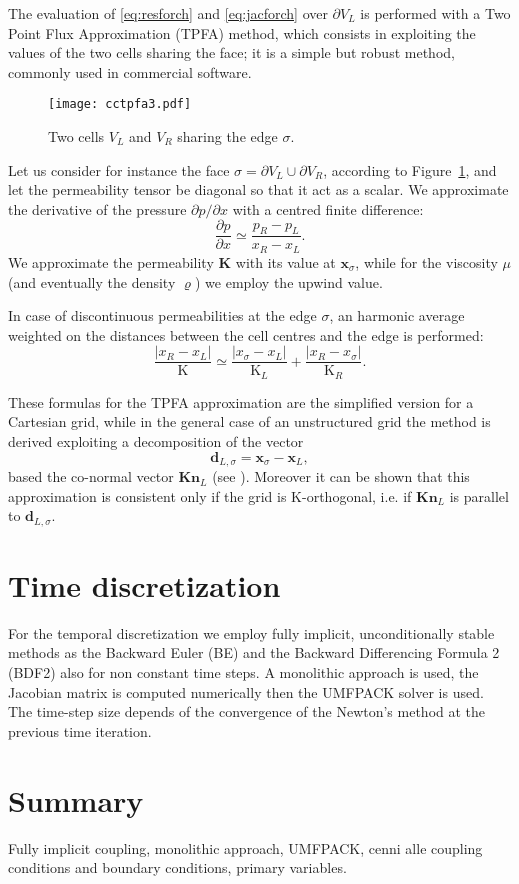 The evaluation of \eqref{eq:resforch} and \eqref{eq:jacforch} over $\partial 
V_L$ is performed with a Two Point Flux Approximation (TPFA) method, which 
consists in exploiting the values of the two cells sharing the face; it is a 
simple but robust method, commonly used in commercial software.
\begin{figure}
	\centering
	\texttt{[image: cctpfa3.pdf]}
	\caption{Two cells $V_L$ and $V_R$ sharing the edge $\sigma$.}
	\label{fig:cctpfa}
\end{figure}
Let us consider for instance the face $\sigma = \partial V_L \cup \partial 
V_R$, according to Figure~\ref{fig:cctpfa}, and let the permeability tensor be 
diagonal so that it act as a scalar. We approximate the derivative of the 
pressure $\partial p /\partial 
x$ with a centred finite difference:
\begin{equation}
\frac{\partial p}{\partial x} \simeq \frac{p_R-p_L}{x_R -x_L}.
\end{equation}
We approximate the permeability $\mathbf{K}$ with its value at 
$\mathbf{x}_\sigma$, while 
for the viscosity $\mu$ (and eventually the density $\varrho$) we employ the 
upwind value.

In case of discontinuous permeabilities at the edge $\sigma$, an harmonic 
average weighted on the distances between the cell centres and the edge is 
performed:
\begin{equation}
\frac{|x_R - x_L|}{\mathrm{K}} \simeq 
\frac{|x_\sigma - x_L|}{\mathrm{K}_L}+\frac{|x_R - x_\sigma|}{\mathrm{K}_R}.
\end{equation}

These formulas for the TPFA approximation are the simplified version for a 
Cartesian grid, while in the general case of an unstructured grid the method is 
derived exploiting a decomposition of the vector
\begin{equation}
\mathbf{d}_{L,\sigma}=\mathbf{x}_\sigma - \mathbf{x}_L,
\end{equation}
based the co-normal vector $\mathbf{Kn}_L$ (see \cite{main:tpfa}). Moreover it 
can be shown that this approximation is consistent only if the grid is 
K-orthogonal, i.e. if $\mathbf{Kn}_L$ is parallel to $\mathbf{d}_{L, \sigma}$. 
\section{Time discretization}
For the temporal discretization we employ fully implicit, unconditionally 
stable methods as the Backward Euler (BE) and the Backward Differencing Formula 
2 (BDF2) also for non constant time steps. A monolithic approach is used, the 
Jacobian matrix is computed 
numerically then the UMFPACK solver is used. The time-step size depends of the 
convergence of the Newton's method at the previous time iteration.
\section{Summary}
Fully implicit coupling, monolithic approach, UMFPACK, cenni alle coupling 
conditions and boundary conditions, primary variables.